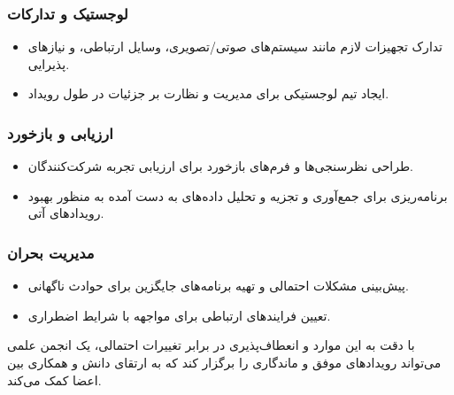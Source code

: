 \subsubsection*{لوجستیک و تدارکات}
\begin{itemize}
	\item تدارک تجهیزات لازم مانند سیستم‌های صوتی/تصویری، وسایل ارتباطی، و نیازهای پذیرایی.
	\item ایجاد تیم لوجستیکی برای مدیریت و نظارت بر جزئیات در طول رویداد.
\end{itemize}

\subsubsection*{ارزیابی و بازخورد}
\begin{itemize}
	\item طراحی نظرسنجی‌ها و فرم‌های بازخورد برای ارزیابی تجربه شرکت‌کنندگان.
	\item برنامه‌ریزی برای جمع‌آوری و تجزیه و تحلیل داده‌های به دست آمده به منظور بهبود رویدادهای آتی.
\end{itemize}

\subsubsection*{مدیریت بحران}
\begin{itemize}
	\item پیش‌بینی مشکلات احتمالی و تهیه برنامه‌های جایگزین برای حوادث ناگهانی.
	\item تعیین فرایندهای ارتباطی برای مواجهه با شرایط اضطراری. 
\end{itemize}

با دقت به این موارد و انعطاف‌پذیری در برابر تغییرات احتمالی، یک انجمن علمی می‌تواند رویدادهای موفق و ماندگاری را برگزار کند که به ارتقای دانش و همکاری بین اعضا کمک می‌کند.


